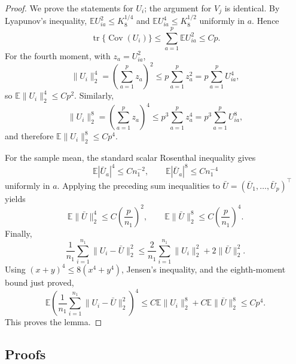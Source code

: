 \documentclass[
  12pt]{article}
\theoremstyle{plain}
\theoremstyle{definition}
\theoremstyle{remark}
\begin{document}
\begin{proof}
We prove the statements for \(U_i\); the argument for \(V_j\) is identical.
By Lyapunov's inequality,
\(\mathbb E U_{ia}^2\le K_8^{1/4}\) and
\(\mathbb E U_{ia}^4\le K_8^{1/2}\) uniformly in \(a\).  Hence
\[
\operatorname{tr}\{\operatorname{Cov}(U_i)\}
\le
\sum_{a=1}^p \mathbb E U_{ia}^2
\le Cp.
\]
For the fourth moment, with \(z_a=U_{ia}^2\),
\[
\|U_i\|_2^4
=
\left(\sum_{a=1}^p z_a\right)^2
\le
p\sum_{a=1}^p z_a^2
=
p\sum_{a=1}^p U_{ia}^4,
\]
so \(\mathbb E\|U_i\|_2^4\le Cp^2\).  Similarly,
\[
\|U_i\|_2^8
=
\left(\sum_{a=1}^p z_a\right)^4
\le
p^3\sum_{a=1}^p z_a^4
=
p^3\sum_{a=1}^p U_{ia}^8,
\]
and therefore \(\mathbb E\|U_i\|_2^8\le Cp^4\).

For the sample mean, the standard scalar Rosenthal inequality gives
\[
\mathbb E|\bar U_a|^4\le Cn_1^{-2},
\qquad
\mathbb E|\bar U_a|^8\le Cn_1^{-4}
\]
uniformly in \(a\).  Applying the preceding sum inequalities to
\(\bar U=(\bar U_1,\ldots,\bar U_p)^\top\) yields
\[
\mathbb E\|\bar U\|_2^4\le C\left(\frac p{n_1}\right)^2,
\qquad
\mathbb E\|\bar U\|_2^8\le C\left(\frac p{n_1}\right)^4.
\]
Finally,
\[
\frac1{n_1}\sum_{i=1}^{n_1}\|U_i-\bar U\|_2^2
\le
\frac2{n_1}\sum_{i=1}^{n_1}\|U_i\|_2^2+2\|\bar U\|_2^2.
\]
Using \((x+y)^4\le 8(x^4+y^4)\), Jensen's inequality, and the eighth-moment
bound just proved,
\[
\mathbb E
\left(
\frac1{n_1}\sum_{i=1}^{n_1}\|U_i-\bar U\|_2^2
\right)^4
\le
C\mathbb E\|U_i\|_2^8
+
C\mathbb E\|\bar U\|_2^8
\le Cp^4 .
\]
This proves the lemma.
\end{proof}

\subsection{Proofs}
\label{subsec:proofs}
\end{document}
